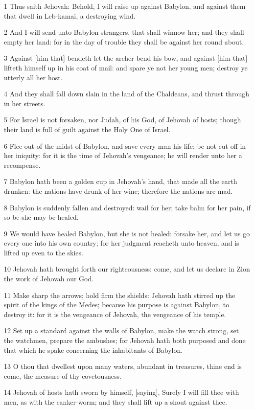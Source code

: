 \par 1 Thus saith Jehovah: Behold, I will raise up against Babylon, and against them that dwell in Leb-kamai, a destroying wind.
\par 2 And I will send unto Babylon strangers, that shall winnow her; and they shall empty her land: for in the day of trouble they shall be against her round about.
\par 3 Against [him that] bendeth let the archer bend his bow, and against [him that] lifteth himself up in his coat of mail: and spare ye not her young men; destroy ye utterly all her host.
\par 4 And they shall fall down slain in the land of the Chaldeans, and thrust through in her streets.
\par 5 For Israel is not forsaken, nor Judah, of his God, of Jehovah of hosts; though their land is full of guilt against the Holy One of Israel.
\par 6 Flee out of the midst of Babylon, and save every man his life; be not cut off in her iniquity: for it is the time of Jehovah's vengeance; he will render unto her a recompense.
\par 7 Babylon hath been a golden cup in Jehovah's hand, that made all the earth drunken: the nations have drunk of her wine; therefore the nations are mad.
\par 8 Babylon is suddenly fallen and destroyed: wail for her; take balm for her pain, if so be she may be healed.
\par 9 We would have healed Babylon, but she is not healed: forsake her, and let us go every one into his own country; for her judgment reacheth unto heaven, and is lifted up even to the skies.
\par 10 Jehovah hath brought forth our righteousness: come, and let us declare in Zion the work of Jehovah our God.
\par 11 Make sharp the arrows; hold firm the shields: Jehovah hath stirred up the spirit of the kings of the Medes; because his purpose is against Babylon, to destroy it: for it is the vengeance of Jehovah, the vengeance of his temple.
\par 12 Set up a standard against the walls of Babylon, make the watch strong, set the watchmen, prepare the ambushes; for Jehovah hath both purposed and done that which he spake concerning the inhabitants of Babylon.
\par 13 O thou that dwellest upon many waters, abundant in treasures, thine end is come, the measure of thy covetousness.
\par 14 Jehovah of hosts hath sworn by himself, [saying], Surely I will fill thee with men, as with the canker-worm; and they shall lift up a shout against thee.
